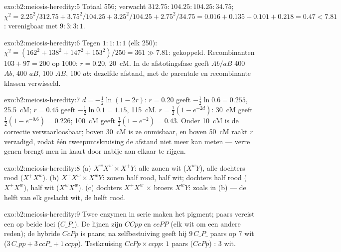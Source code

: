 \begin{solution}{exo:b2:meiosis-heredity:5}
Totaal 556; verwacht $312.75 : 104.25 : 104.25 : 34.75$; $\chi^2 =
2.25^2/312.75 + 3.75^2/104.25 + 3.25^2/104.25 + 2.75^2/34.75 = 0.016
+ 0.135 + 0.101 + 0.218 = 0.47 < 7.81$: verenigbaar met $9 : 3 : 3 :
1$.
\end{solution}

\begin{solution}{exo:b2:meiosis-heredity:6}
Tegen $1 : 1 : 1 : 1$ (elk 250): $\chi^2 = (162^2 + 138^2 + 147^2
+ 153^2)/250 = 361 \gg 7.81$: gekoppeld. Recombinanten $103 + 97 = 200$
op 1000: $r = 0.20$, \qty{20}{cM}. In de afstotingsfase geeft $Ab/aB$ 400
$Ab$, 400 $aB$, 100 $AB$, 100 $ab$: dezelfde afstand, met de parentale
en recombinante klassen verwisseld.
\end{solution}

\begin{solution}{exo:b2:meiosis-heredity:7}
$d = -\tfrac12\ln(1 - 2r)$: $r = 0.20$ geeft $-\tfrac12\ln 0.6 =
0.255$, \qty{25.5}{cM}; $r = 0.45$ geeft $-\tfrac12\ln 0.1 = 1.15$,
\qty{115}{cM}. $r = \tfrac12(1 - e^{-2d})$: \qty{30}{cM} geeft
$\tfrac12(1 - e^{-0.6}) = 0.226$; \qty{100}{cM} geeft $\tfrac12(1 -
e^{-2}) = 0.43$. Onder \qty{10}{cM} is de correctie verwaarloosbaar;
boven \qty{30}{cM} is ze onmisbaar, en boven \qty{50}{cM} raakt $r$
verzadigd, zodat één tweepuntskruising de afstand niet meer kan meten
--- verre genen brengt men in kaart door nabije aan elkaar te rijgen.
\end{solution}

\begin{solution}{exo:b2:meiosis-heredity:8}
(a) $X^wX^w \times X^+Y$: alle zonen wit ($X^wY$), alle dochters rood
($X^+X^w$). (b) $X^+X^w \times X^wY$: zonen half rood, half wit;
dochters half rood ($X^+X^w$), half wit ($X^wX^w$). (c) dochters
$X^+X^w$ $\times$ broers $X^wY$: zoals in (b) --- de helft van elk geslacht
wit, de helft rood.
\end{solution}

\begin{solution}{exo:b2:meiosis-heredity:9}
Twee enzymen in serie maken het pigment; paars vereist een 
 op beide loci ($C\_P\_$). De lijnen zijn $CCpp$ en $ccPP$
(elk wit om een andere reden); de hybride $CcPp$ is paars;
na zelfbestuiving geeft hij $9\,C\_P\_$ paars op $7$ wit ($3\,C\_pp + 3\,ccP\_ +
1\,ccpp$). Testkruising $CcPp\times ccpp$: $1$ paars ($CcPp$) : $3$
wit.
\end{solution}

